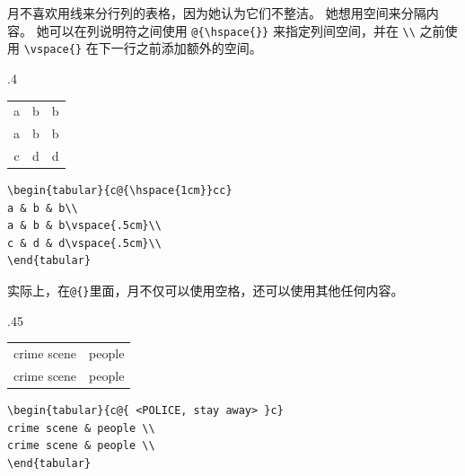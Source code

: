 月不喜欢用线来分行列的表格，因为她认为它们不整洁。 她想用空间来分隔内容。 她可以在列说明符之间使用 \verb=@{\hspace{}}= 来指定列间空间，并在 \verb=\\= 之前使用 \verb=\vspace{}= 在下一行之前添加额外的空间。
\begin{miniexammar}{.4\textandmarginlen}{
\begin{tabular}{c@{\hspace{1cm}}cc}
a & b & b\\
a & b & b\vspace{.5cm}\\
c & d & d\vspace{.5cm}\\
\end{tabular}
}
\begin{lstlisting}
\begin{tabular}{c@{\hspace{1cm}}cc}
a & b & b\\
a & b & b\vspace{.5cm}\\
c & d & d\vspace{.5cm}\\
\end{tabular} 
\end{lstlisting}
\end{miniexammar}

实际上，在\verb=@{}=里面，月不仅可以使用空格，还可以使用其他任何内容。
\begin{miniexammar}{.45\textandmarginlen}{
\begin{tabular}{c@{ <POLICE, stay away> }c}
crime scene & people \\
crime scene & people \\
\end{tabular}
}
\begin{lstlisting}
\begin{tabular}{c@{ <POLICE, stay away> }c}
crime scene & people \\
crime scene & people \\
\end{tabular}
\end{lstlisting}
\end{miniexammar}

